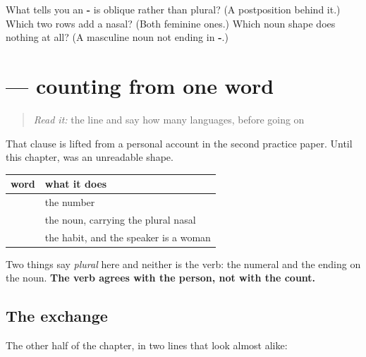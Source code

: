 \begin{tcolorbox}[breakable,colback=teal!4,colframe=teal!35!black,title={Before you move on}]
What tells you an \textbf{-} is oblique rather than plural? (A postposition behind it.) Which two rows add a nasal? (Both feminine ones.) Which noun shape does nothing at all? (A masculine noun not ending in \textbf{-}.)
\end{tcolorbox}
\section[\texorpdfstring{\hi{दो} \hi{भाषाएँ} \hi{बोलती} \hi{है} (do bhāṣāẽ boltī hai)}{दो भाषाएँ बोलती है (do bhāṣāẽ boltī hai)}]{    — counting from one word}

\label{lesson:HI-C91-sintesis-sangya}



\begin{quote}
\emph{Read it:} the line and say how many languages, before going on

\begin{quote}
   
\end{quote}
\end{quote}

\begin{grammarlens}[title={Grammar Lens: the line a paper prints}]
That clause is lifted from a personal account in the second practice paper. Until this chapter, \textbf{} was an unreadable shape.

\noindent
\begin{tabularx}{\linewidth}{@{}>{\raggedright\arraybackslash}X>{\raggedright\arraybackslash}X@{}}
\toprule
\textbf{word} & \textbf{what it does} \\
\midrule
\hi{दो} & the number \\
\hi{भाषाएँ} & the noun, carrying the plural nasal \\
\hi{बोलती} \hi{है} & the habit, and the speaker is a woman \\
\bottomrule
\end{tabularx}

Two things say \emph{plural} here and neither is the verb: the numeral and the ending on the noun. \textbf{The verb agrees with the person, not with the count.}
\end{grammarlens}

\subsection*{The exchange}
The other half of the chapter, in two lines that look almost alike:

